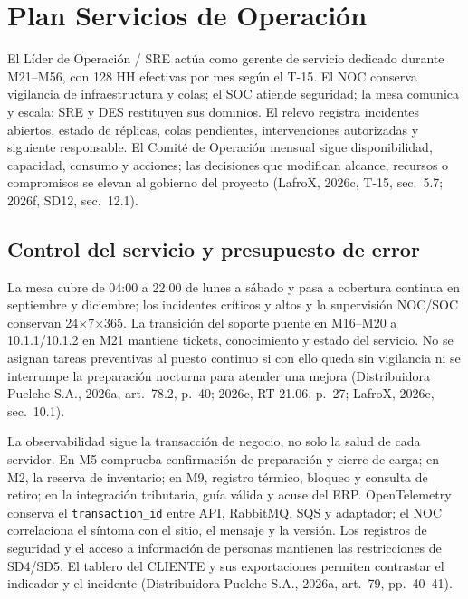 \section{Plan Servicios de Operación}
\label{sec:sd11-operacion}

El Líder de Operación / SRE actúa como gerente de servicio dedicado durante M21--M56, con 128 HH efectivas por mes según el T-15. El NOC conserva vigilancia de infraestructura y colas; el SOC atiende seguridad; la mesa comunica y escala; SRE y DES restituyen sus dominios. El relevo registra incidentes abiertos, estado de réplicas, colas pendientes, intervenciones autorizadas y siguiente responsable. El Comité de Operación mensual sigue disponibilidad, capacidad, consumo y acciones; las decisiones que modifican alcance, recursos o compromisos se elevan al gobierno del proyecto (LafroX, 2026c, T-15, sec.~5.7; 2026f, SD12, sec.~12.1).

\subsection{Control del servicio y presupuesto de error}
\label{subsec:sd11-confiabilidad}

La mesa cubre de 04:00 a 22:00 de lunes a sábado y pasa a cobertura continua en septiembre y diciembre; los incidentes críticos y altos y la supervisión NOC/SOC conservan 24$\times$7$\times$365. La transición del soporte puente en M16--M20 a 10.1.1/10.1.2 en M21 mantiene tickets, conocimiento y estado del servicio. No se asignan tareas preventivas al puesto continuo si con ello queda sin vigilancia ni se interrumpe la preparación nocturna para atender una mejora (Distribuidora Puelche S.A., 2026a, art.~78.2, p.~40; 2026c, RT-21.06, p.~27; LafroX, 2026e, sec.~10.1).

La observabilidad sigue la transacción de negocio, no solo la salud de cada servidor. En M5 comprueba confirmación de preparación y cierre de carga; en M2, la reserva de inventario; en M9, registro térmico, bloqueo y consulta de retiro; en la integración tributaria, guía válida y acuse del ERP. OpenTelemetry conserva el \texttt{transaction\_id} entre API, RabbitMQ, SQS y adaptador; el NOC correlaciona el síntoma con el sitio, el mensaje y la versión. Los registros de seguridad y el acceso a información de personas mantienen las restricciones de SD4/SD5. El tablero del CLIENTE y sus exportaciones permiten contrastar el indicador y el incidente (Distribuidora Puelche S.A., 2026a, art.~79, pp.~40--41).

